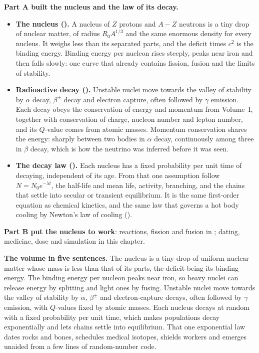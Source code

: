 \textbf{Part A built the nucleus and the law of its decay.}
\begin{itemize}
\item \textbf{The nucleus ().} A nucleus of $Z$ protons and $A-Z$ neutrons is a tiny drop of
nuclear matter, of radius $R_0A^{1/3}$ and the same enormous density for every nucleus. It weighs less than its
separated parts, and the deficit times $c^2$ is the binding energy. Binding energy per nucleon rises steeply,
peaks near iron and then falls slowly: one curve that already contains fission, fusion and the limits of
stability.
\item \textbf{Radioactive decay ().} Unstable nuclei move towards the valley of stability by
$\alpha$ decay, $\beta^\pm$ decay and electron capture, often followed by $\gamma$ emission. Each decay obeys the
conservation of energy and momentum from Volume~I, together with conservation of charge, nucleon number and
lepton number, and its $Q$-value comes from atomic masses. Momentum conservation shares the energy: sharply between two
bodies in $\alpha$ decay, continuously among three in $\beta$ decay, which is how the neutrino was inferred
before it was seen.
\item \textbf{The decay law ().} Each nucleus has a fixed probability per unit time of
decaying, independent of its age. From that one assumption follow $N=N_0e^{-\lambda t}$, the half-life and mean
life, activity, branching, and the chains that settle into secular or transient equilibrium. It is the same
first-order equation as chemical kinetics, and the same law that governs a hot body cooling by Newton's law
of cooling ().
\end{itemize}

\textbf{Part B put the nucleus to work}: reactions, fission and fusion in ; dating,
medicine, dose and simulation in this chapter.

\medskip
\textbf{The volume in five sentences.} The nucleus is a tiny drop of uniform nuclear matter whose mass is
less than that of its parts, the deficit being its binding energy. The binding energy per nucleon peaks near
iron, so heavy nuclei can release energy by splitting and light ones by fusing. Unstable nuclei move towards the
valley of stability by $\alpha$, $\beta^\pm$ and electron-capture decays, often followed by $\gamma$ emission,
with $Q$-values fixed by atomic masses. Each nucleus decays at random with a fixed probability per unit time,
which makes populations decay exponentially and lets chains settle into equilibrium. That one exponential law
dates rocks and bones, schedules medical isotopes, shields workers and emerges unaided from a few lines of
random-number code.

